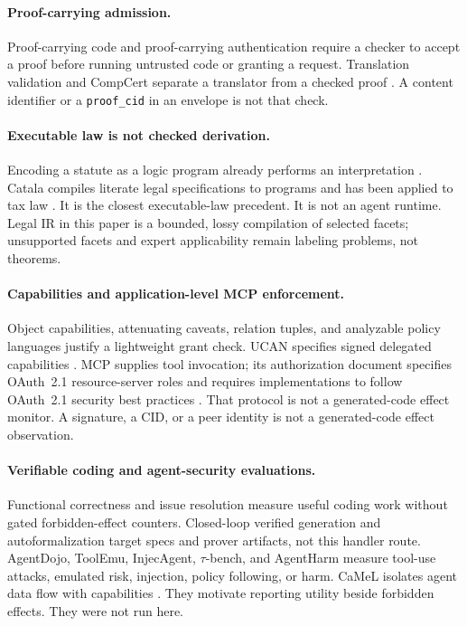 \documentclass{article}
\begin{document}
\paragraph{Proof-carrying admission.}
Proof-carrying code \citep{necula1997pcc} and proof-carrying authentication \citep{appel1999pca} require a checker to accept a proof before running untrusted code or granting a request. Translation validation and CompCert separate a translator from a checked proof \citep{pnueli1998translation,leroy2009compcert}. A content identifier or a \texttt{proof\_cid} in an envelope is not that check.

\paragraph{Executable law is not checked derivation.}
Encoding a statute as a logic program already performs an interpretation \citep{sergot1986bna,prakken2015lawlogic,benzmueller2020logikey}. Catala compiles literate legal specifications to programs and has been applied to tax law \citep{catala,merigoux2021tax}. It is the closest executable-law precedent. It is not an agent runtime. Legal IR in this paper is a bounded, lossy compilation of selected facets; unsupported facets and expert applicability remain labeling problems, not theorems.

\paragraph{Capabilities and application-level MCP enforcement.}
Object capabilities, attenuating caveats, relation tuples, and analyzable policy languages \citep{miller2006robust,birgisson2014macaroons,pang2019zanzibar,cutler2024cedar} justify a lightweight grant check. UCAN specifies signed delegated capabilities \citep{ucan}. MCP supplies tool invocation; its authorization document specifies OAuth~2.1 resource-server roles and requires implementations to follow OAuth~2.1 security best practices \citep{mcp,mcp-auth}. That protocol is not a generated-code effect monitor. A signature, a CID, or a peer identity is not a generated-code effect observation.

\paragraph{Verifiable coding and agent-security evaluations.}
Functional correctness and issue resolution \citep{chen2021codex,jimenez2024swebench} measure useful coding work without gated forbidden-effect counters. Closed-loop verified generation and autoformalization \citep{sun2024clover,yang2023leandojo,wu2022autoformalization} target specs and prover artifacts, not this handler route. AgentDojo, ToolEmu, InjecAgent, $\tau$-bench, and AgentHarm \citep{debenedetti2024agentdojo,ruan2024toolemu,zhan2024injecagent,yao2024taubench,andriushchenko2025agentharm} measure tool-use attacks, emulated risk, injection, policy following, or harm. CaMeL isolates agent data flow with capabilities \citep{debenedetti2025camel}. They motivate reporting utility beside forbidden effects. They were not run here.
\end{document}
